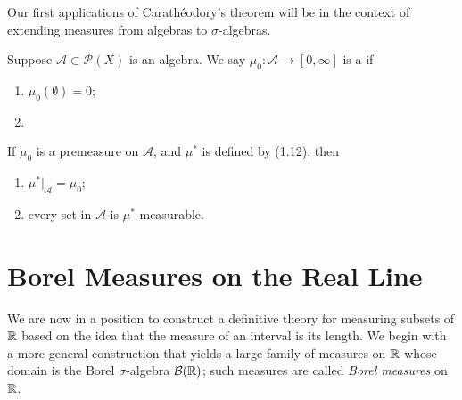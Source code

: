 \begin{theorem}

\end{theorem}

Our first applications of Carath\'{e}odory's theorem will be in the context of extending measures from algebras to $\sigma$-algebras.

\begin{definition}[Premeasure]
Suppose $\mathcal{A}\subset\mathcal{P}(X)$ is an algebra. We say $\mu_0\colon\mathcal{A}\to[0,\infty]$ is a  if
\begin{enumerate}[label=(\roman*)]
\item $\mu_0(\emptyset)=0$;
\item 
\end{enumerate}
\end{definition}

\begin{proposition}
If $\mu_0$ is a premeasure on $\mathcal{A}$, and $\mu^*$ is defined by (1.12), then
\begin{enumerate}[label=(\roman*)]
\item $\mu^*|_{\mathcal{A}}=\mu_0$;
\item every set in $\mathcal{A}$ is $\mu^*$ measurable.
\end{enumerate}
\end{proposition}

\begin{theorem}

\end{theorem}
\pagebreak

\section{Borel Measures on the Real Line}
We are now in a position to construct a definitive theory for measuring subsets of $\mathbb R$ based on the idea that the measure of an interval is its length. 
We begin with a more general construction that yields a large family of measures on $\mathbb R$ whose domain is the Borel $\sigma$-algebra $\mathcal{B}(\mathbb R)$; such measures are called \emph{Borel measures} on $\mathbb R$.

